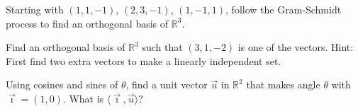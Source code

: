 \documentclass{ximera}
\begin{document}
\begin{exercise}
    Starting with $(1,1,-1)$, $(2,3,-1)$, $(1,-1,1)$, follow the Gram-Schmidt process to find an orthogonal basis of ${\mathbb{R}}^3$.
\end{exercise}

\begin{exercise}
    Find an orthogonal basis of ${\mathbb{R}}^3$ such that $(3,1,-2)$ is one of the vectors.  Hint: First find two extra vectors to make a linearly independent set.
\end{exercise}

\begin{exercise}
    Using cosines and sines of $\theta$, find a unit vector $\vec{u}$ in ${\mathbb{R}}^2$ that makes angle $\theta$ with $\vec{\imath} = (1,0)$.  What is $\langle \vec{\imath} , \vec{u} \rangle$?
\end{exercise}

\end{document}
